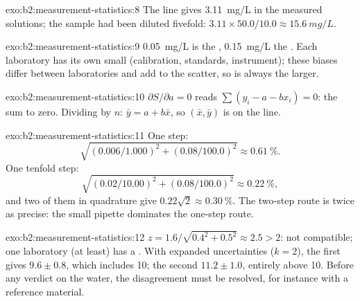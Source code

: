 \begin{solution}{exo:b2:measurement-statistics:8}
The line gives \qty{3.11}{mg/L} in the measured solutions; the sample had been diluted fivefold:
$3.11 \times 50.0/10.0 \approx \qty{15.6}{mg/L}$.
\end{solution}

\begin{solution}{exo:b2:measurement-statistics:9}
\qty{0.05}{mg/L} is the , \qty{0.15}{mg/L} the . Each laboratory has its
own small  (calibration, standards, instrument); these biases differ between laboratories and add
to the scatter, so  is always the larger.
\end{solution}

\begin{solution}{exo:b2:measurement-statistics:10}
$\partial S/\partial a = 0$ reads $\sum(y_i - a - bx_i) = 0$: the  sum to zero. Dividing by
$n$: $\bar y = a + b\bar x$, so $(\bar x, \bar y)$ is on the line.
\end{solution}

\begin{solution}{exo:b2:measurement-statistics:11}
One step:
\[\sqrt{(0.006/1.000)^2 + (0.08/100.0)^2} \approx 0.61~\%.\]
One tenfold step:
\[\sqrt{(0.02/10.00)^2 + (0.08/100.0)^2} \approx 0.22~\%,\]
and two of them in quadrature give $0.22\sqrt2 \approx 0.30~\%$. The two-step route is twice as precise: the small pipette dominates the one-step
route.
\end{solution}

\begin{solution}{exo:b2:measurement-statistics:12}
$z = 1.6/\sqrt{0.4^2 + 0.5^2} \approx 2.5 > 2$: not compatible; one laboratory (at least) has a .
With expanded uncertainties ($k = 2$), the first gives $9.6 \pm 0.8$, which includes 10; the second
$11.2 \pm 1.0$, entirely above 10. Before any verdict on the water, the disagreement must be resolved,
for instance with a reference material.
\end{solution}

